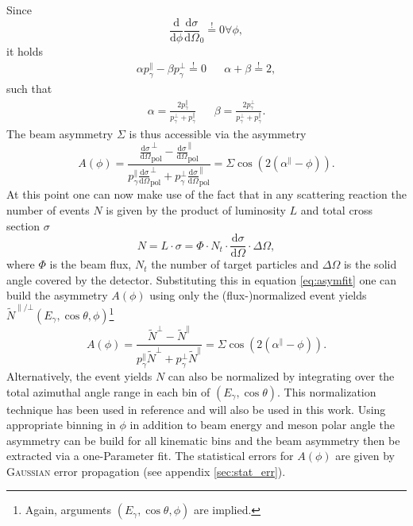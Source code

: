Since $$\frac{\text{d}}{\text{d}\phi}\frac{\text{d}\sigma}{\text{d}\Omega}_0\overset{!}{=}0\forall\phi,$$ it holds \begin{align}
	\alpha p_\gamma^\parallel-\beta p_\gamma^\bot \overset{!}{=}0 && \alpha+\beta\overset{!}{=}2,
\end{align}
such that
\begin{align}
	\alpha =\frac{2p_\gamma^\parallel}{p_\gamma^\bot+p_\gamma^\parallel} && \beta=\frac{2p_\gamma^\bot}{p_\gamma^\bot+p_\gamma^\parallel}.
	\label{eq:alphabeta}
\end{align}
The beam asymmetry $\Sigma$ is thus accessible via the asymmetry \begin{equation}
	A(\phi)=\frac{\frac{\text{d}\sigma}{\text{d}\Omega}_\text{pol}^\bot-\frac{\text{d}\sigma}{\text{d}\Omega}_\text{pol}^\parallel}{p_\gamma^\parallel\frac{\text{d}\sigma}{\text{d}\Omega}_\text{pol}^\bot+p_\gamma^\bot\frac{\text{d}\sigma}{\text{d}\Omega}_\text{pol}^\parallel}=\Sigma\cos\left(2\left(\alpha^\parallel-\phi\right)\right).
	\label{eq:asymfit}
\end{equation}
At this point one can now make use of the fact that in any scattering reaction the number of events $N$ is given by the product of luminosity $L$ and total cross section $\sigma$ \cite{povh} $$N=L\cdot\sigma=\Phi\cdot N_t\cdot\frac{\text{d}\sigma}{\text{d}\Omega}\cdot\Delta\Omega,$$
where $\Phi$ is the beam flux, $N_t$ the number of target particles and $\Delta\Omega$ is the solid angle covered by the detector. Substituting this in equation \eqref{eq:asymfit} one can build the asymmetry $A(\phi)$ using only the (flux-)normalized event yields $\tilde{N}^{\parallel/\bot}\left(E_\gamma,\cos\theta,\phi\right)$\footnote{Again, arguments $\left(E_\gamma,\cos\theta,\phi\right)$ are implied.}
\begin{equation}
	A(\phi)=\frac{\tilde{N}^\bot-\tilde{N}^\parallel}{p_\gamma^\parallel\tilde{N}^\bot+p_\gamma^\bot\tilde{N}^\parallel}=\Sigma\cos\left(2\left(\alpha^\parallel-\phi\right)\right).
	\label{eq:evyieldasym}
\end{equation}
Alternatively, the event yields $N$ can also be normalized by integrating over the total azimuthal angle range in each bin of $(E_\gamma,\cos\theta)$. This normalization technique has been used in reference \cite{farahphd} and will also be used in this work. Using appropriate binning in $\phi$ in addition to beam energy and meson polar angle the asymmetry can be build for all kinematic bins and the beam asymmetry then be extracted via a one-Parameter fit. The statistical errors for $A(\phi)$ are given by \textsc{Gaussian} error propagation (see appendix \ref{sec:stat_err}). 

